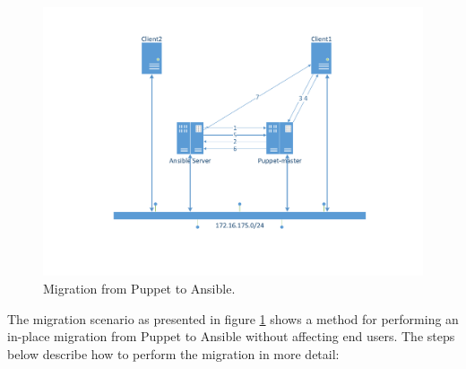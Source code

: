\begin{figure}[!ht]
        \includegraphics[scale=0.5]{img/PuppettoAnsible.pdf}
        \caption{Migration from Puppet to Ansible.}
        \label{fig:situation1}
\end{figure}

The migration scenario as presented in figure \ref{fig:situation1} shows a method for performing an in-place migration from Puppet to Ansible without affecting end users. The steps below describe how to perform the migration in more detail:

